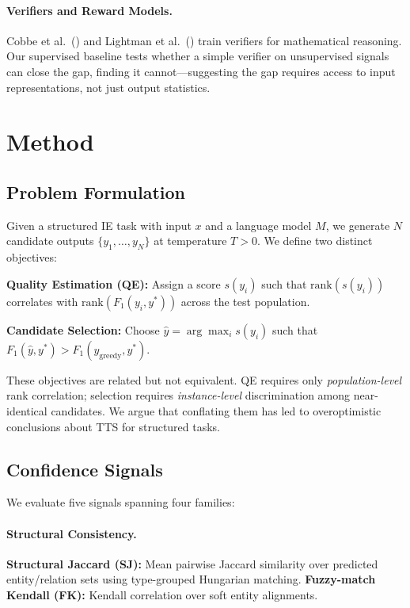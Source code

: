 \documentclass[11pt]{article}
\begin{document}
\paragraph{Verifiers and Reward Models.} Cobbe et al.\ (\citeyear{cobbe2021training}) and Lightman et al.\ (\citeyear{lightman2023lets}) train verifiers for mathematical reasoning. Our supervised baseline tests whether a simple verifier on unsupervised signals can close the gap, finding it cannot---suggesting the gap requires access to input representations, not just output statistics.

\section{Method}

\subsection{Problem Formulation}

Given a structured IE task with input $x$ and a language model $M$, we generate $N$ candidate outputs $\{y_1, \ldots, y_N\}$ at temperature $T > 0$. We define two distinct objectives:

\textbf{Quality Estimation (QE):} Assign a score $s(y_i)$ such that $\text{rank}(s(y_i))$ correlates with $\text{rank}(F_1(y_i, y^*))$ across the test population.

\textbf{Candidate Selection:} Choose $\hat{y} = \arg\max_i s(y_i)$ such that $F_1(\hat{y}, y^*) > F_1(y_{\text{greedy}}, y^*)$.

These objectives are related but not equivalent. QE requires only \emph{population-level} rank correlation; selection requires \emph{instance-level} discrimination among near-identical candidates. We argue that conflating them has led to overoptimistic conclusions about TTS for structured tasks.

\subsection{Confidence Signals}

We evaluate five signals spanning four families:

\paragraph{Structural Consistency.} \textbf{Structural Jaccard (SJ):} Mean pairwise Jaccard similarity over predicted entity/relation sets using type-grouped Hungarian matching. \textbf{Fuzzy-match Kendall (FK):} Kendall correlation over soft entity alignments.
\end{document}
